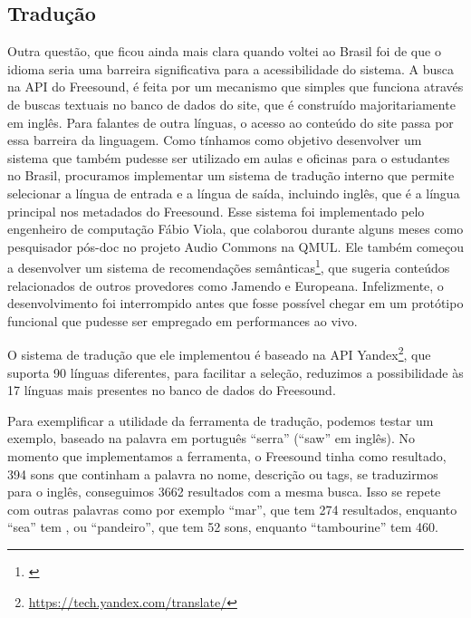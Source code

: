 


\subsection{Tradução}

Outra questão, que ficou ainda mais clara quando voltei ao Brasil foi de que o idioma seria uma barreira significativa para a acessibilidade do sistema. A busca na API do Freesound, é feita por um mecanismo que simples que funciona através de buscas textuais no banco de dados do site, que é construído majoritariamente em inglês. Para falantes de outra línguas, o acesso ao conteúdo do site passa por essa barreira da linguagem. Como tínhamos como objetivo desenvolver um sistema que também pudesse ser utilizado em aulas e oficinas para o estudantes no Brasil, procuramos implementar um sistema de tradução interno que permite selecionar a língua de entrada e a língua de saída, incluindo inglês, que é a língua principal nos metadados do Freesound. Esse sistema foi implementado pelo engenheiro de computação Fábio Viola, que colaborou durante alguns meses como pesquisador pós-doc no projeto Audio Commons na QMUL. Ele também começou a desenvolver um sistema de recomendações semânticas\footnote{\cite{Viola2018}}, que sugeria conteúdos relacionados de outros provedores como Jamendo e Europeana. Infelizmente, o desenvolvimento foi interrompido antes que fosse possível chegar em um protótipo funcional que pudesse ser empregado em performances ao vivo.

O sistema de tradução que ele implementou é baseado na API Yandex\footnote{\url{https://tech.yandex.com/translate/}}, que suporta 90 línguas diferentes, para facilitar a seleção, reduzimos a possibilidade às 17 línguas mais presentes no banco de dados do Freesound. 

Para exemplificar a utilidade da ferramenta de tradução, podemos testar um exemplo, baseado na palavra em português ``serra'' (``saw'' em inglês). No momento que implementamos a ferramenta, o Freesound tinha como resultado, 394 sons que continham a palavra no nome, descrição ou tags, se traduzirmos para o inglês, conseguimos 3662 resultados com a mesma busca. Isso se repete com outras palavras como por exemplo ``mar'', que tem 274 resultados, enquanto ``sea'' tem , ou ``pandeiro'', que tem 52 sons, enquanto ``tambourine'' tem 460.


